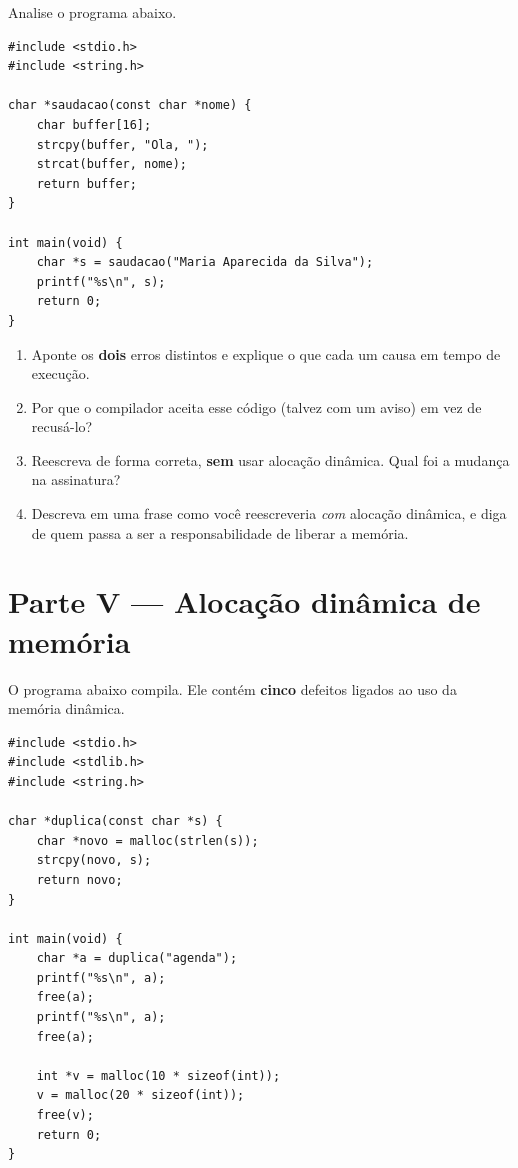 \documentclass[11pt,a4paper]{article}
\begin{document}
Analise o programa abaixo.

\begin{lstlisting}
#include <stdio.h>
#include <string.h>

char *saudacao(const char *nome) {
    char buffer[16];
    strcpy(buffer, "Ola, ");
    strcat(buffer, nome);
    return buffer;
}

int main(void) {
    char *s = saudacao("Maria Aparecida da Silva");
    printf("%s\n", s);
    return 0;
}
\end{lstlisting}

\begin{enumerate}[label=(\alph*),leftmargin=1.8em,itemsep=1pt]
  \item Aponte os \textbf{dois} erros distintos e explique o que cada um causa em
        tempo de execução.
  \item Por que o compilador aceita esse código (talvez com um aviso) em vez de
        recusá-lo?
  \item Reescreva  de forma correta, \textbf{sem} usar alocação dinâmica.
        Qual foi a mudança na assinatura?
  \item Descreva em uma frase como você reescreveria  \emph{com} alocação
        dinâmica, e diga de quem passa a ser a responsabilidade de liberar a memória.
\end{enumerate}

\section{Parte V --- Alocação dinâmica de memória}

O programa abaixo compila. Ele contém \textbf{cinco} defeitos ligados ao uso da
memória dinâmica.

\begin{lstlisting}
#include <stdio.h>
#include <stdlib.h>
#include <string.h>

char *duplica(const char *s) {
    char *novo = malloc(strlen(s));
    strcpy(novo, s);
    return novo;
}

int main(void) {
    char *a = duplica("agenda");
    printf("%s\n", a);
    free(a);
    printf("%s\n", a);
    free(a);

    int *v = malloc(10 * sizeof(int));
    v = malloc(20 * sizeof(int));
    free(v);
    return 0;
}
\end{lstlisting}
\end{document}
